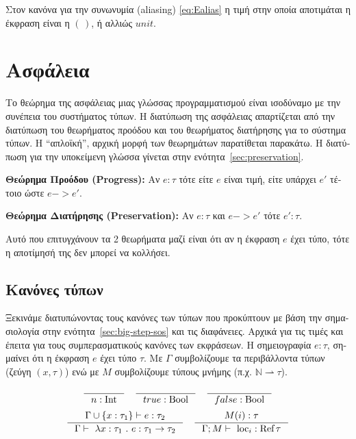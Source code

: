 \documentclass[12pt]{article}
\begin{document}
\textgreek{Στον κανόνα για την συνωνυμία} (aliasing) \ref{eq:Ealias} 
\textgreek{η τιμή στην οποία αποτιμάται η έκφραση είναι η $(\,)$, ή αλλιώς
$unit$.}

\section{\textgreek{Ασφάλεια}}
\textgreek{Το θεώρημα της ασφάλειας μιας γλώσσας προγραμματισμού είναι ισοδύναμο
με την συνέπεια του συστήματος τύπων. Η διατύπωση της ασφάλειας απαρτίζεται
από την διατύπωση του θεωρήματος προόδου και του θεωρήματος διατήρησης
για το σύστημα τύπων.
Η ``απλοϊκή'', αρχική μορφή των θεωρημάτων παρατίθεται παρακάτω.
Η διατύπωση για την υποκείμενη γλώσσα γίνεται
στην ενότητα~\ref{sec:preservation}.}

\smallskip
\noindent
\textbf{\textgreek{Θεώρημα Προόδου} (Progress):}
\textgreek{Αν $e : \tau$ τότε είτε $e$ είναι τιμή, είτε υπάρχει $e'$ τέτοιο
ώστε $e -> e'$.}

\smallskip
\noindent
\textbf{\textgreek{Θεώρημα Διατήρησης} (Preservation):}
\textgreek{Αν $e : \tau$ και $e -> e'$ τότε $e' : \tau$.}

\smallskip
\textgreek{Αυτό που επιτυγχάνουν τα 2 θεωρήματα μαζί είναι ότι αν η έκφραση $e$ έχει τύπο,
τότε η αποτίμησή της δεν μπορεί να κολλήσει.}

\subsection{\textgreek{Κανόνες τύπων}}
\textgreek{Ξεκινάμε διατυπώνοντας τους κανόνες των τύπων που 
προκύπτουν με βάση την σημασιολογία στην 
ενότητα~\ref{sec:big-step-sos} και τις διαφάνειες.
Αρχικά για τις τιμές και έπειτα για τους συμπερασματικούς κανόνες των 
εκφράσεων.
Η σημειογραφία $e : \tau$, σημαίνει ότι η έκφραση $e$ έχει τύπο $\tau$.
Με $\Gamma$ συμβολίζουμε τα περιβάλλοντα τύπων (ζεύγη $(x, \tau)$) ενώ
με $M$ συμβολίζουμε τύπους μνήμης (π.χ. $\mathbb{N} \rightharpoonup \tau$).}


\begin{align*}
    \inference[]{}{
        n : \textrm{Int}
    }
    &&
    \inference[]{}{
        true : \textrm{Bool}
    }
    &&
    \inference[]{}{
        false : \textrm{Bool}
    }
\end{align*}
\begin{align*}
    \inference[]{
        \Gamma \cup \{x : \tau_1\} |- e : \tau_2
    }{
        \Gamma |-~ \lambda x:\tau_1 ~.~ e  : \tau_1 -> \tau_2
    }&&
    \inference[]{
        M(i) : \tau
    }{
        \Gamma; M |-~ \textrm{loc}_i : \textrm{Ref}\, \tau
    }
\end{align*}
\end{document}
